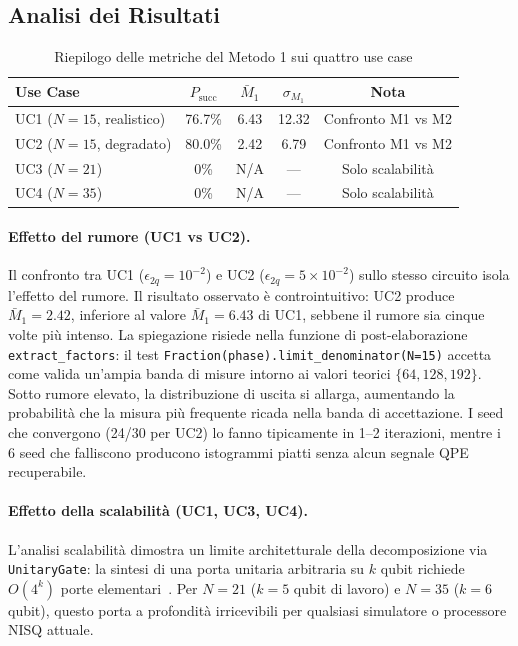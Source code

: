 \begin{onehalfspace}
\section{Analisi dei Risultati}
\label{sec:analisi_m1}

\begin{table}[H]
\centering
\caption{Riepilogo delle metriche del Metodo 1 sui quattro use case}
\label{tab:riepilogo_m1}
\begin{tabular}{lcccc}
\hline
\textbf{Use Case} & \textbf{$P_{\text{succ}}$} & \textbf{$\bar{M}_1$} & \textbf{$\sigma_{M_1}$} & \textbf{Nota} \\
\hline
UC1 ($N=15$, realistico) & 76.7\% & 6.43 & 12.32 & Confronto M1 vs M2 \\
UC2 ($N=15$, degradato)  & 80.0\% & 2.42 &  6.79 & Confronto M1 vs M2 \\
UC3 ($N=21$)             &  0\%   & N/A  &  ---  & Solo scalabilità \\
UC4 ($N=35$)             &  0\%   & N/A  &  ---  & Solo scalabilità \\
\hline
\end{tabular}
\end{table}

\paragraph{Effetto del rumore (UC1 vs UC2).}
Il confronto tra UC1 ($\epsilon_{2q}=10^{-2}$) e UC2 ($\epsilon_{2q}=5\times10^{-2}$) sullo stesso circuito isola l'effetto del rumore. Il risultato osservato è controintuitivo: UC2 produce $\bar{M}_1 = 2.42$, inferiore al valore $\bar{M}_1 = 6.43$ di UC1, sebbene il rumore sia cinque volte più intenso. La spiegazione risiede nella funzione di post-elaborazione \texttt{extract\_factors}: il test \texttt{Fraction(phase).limit\_denominator(N=15)} accetta come valida un'ampia banda di misure intorno ai valori teorici $\{64, 128, 192\}$. Sotto rumore elevato, la distribuzione di uscita si allarga, aumentando la probabilità che la misura più frequente ricada nella banda di accettazione. I seed che convergono (24/30 per UC2) lo fanno tipicamente in 1--2 iterazioni, mentre i 6 seed che falliscono producono istogrammi piatti senza alcun segnale QPE recuperabile.

\paragraph{Effetto della scalabilità (UC1, UC3, UC4).}
L'analisi scalabilità dimostra un limite architetturale della decomposizione via \texttt{UnitaryGate}: la sintesi di una porta unitaria arbitraria su $k$ qubit richiede $O(4^k)$ porte elementari~\cite{Barenco1995}. Per $N=21$ ($k=5$ qubit di lavoro) e $N=35$ ($k=6$ qubit), questo porta a profondità irricevibili per qualsiasi simulatore o processore NISQ attuale.


\end{onehalfspace}
